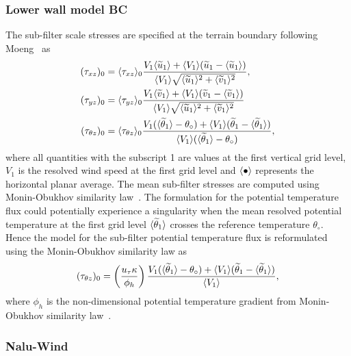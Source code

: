 \subsubsection{\label{sec:wallmodelBC}Lower wall model BC}
The sub-filter scale stresses are specified at the terrain boundary following
Moeng~\cite{Moeng1984} as
\begin{align}
 (\tau_{xz})_0 &= \langle \tau_{xz} \rangle_0 \frac{V_1 \langle \widetilde{u}_1 \rangle + \langle V_1 \rangle (\widetilde{u}_1 - \langle \widetilde{u}_1 \rangle ) }{ \langle V_1 \rangle \sqrt{\langle \widetilde{u}_1 \rangle^2 + \langle \widetilde{v}_1 \rangle^2 } } , \\
 (\tau_{yz})_0 &= \langle \tau_{yz} \rangle_0 \frac{V_1 \langle \widetilde{v}_1 \rangle + \langle V_1 \rangle (\widetilde{v}_1 - \langle \widetilde{v}_1 \rangle ) }{ \langle V_1 \rangle \sqrt{\langle \widetilde{u}_1 \rangle^2 + \langle \widetilde{v}_1 \rangle^2 } } \\
  (\tau_{\theta z})_0 &= \langle \tau_{\theta z} \rangle_0 \frac{V_1 ( \langle \widetilde{\theta}_1 \rangle - \theta_{\circ} ) + \langle V_1 \rangle (\widetilde{\theta}_1 - \langle \widetilde{\theta}_1 \rangle ) }{ \langle V_1 \rangle ( \langle \widetilde{\theta}_1 \rangle - \theta_{\circ} ) },
\end{align}
where all quantities with the subscript 1 are values at the first vertical grid
level, $V_1$ is the resolved wind speed at the first grid level and
$\langle \bullet \rangle$ represents the horizontal planar average. The mean
sub-filter stresses are computed using Monin-Obukhov similarity
law~\cite{Etling1996}. The formulation for the potential temperature flux could
potentially experience a singularity when the mean resolved potential
temperature at the first grid level $\langle \widetilde{\theta}_1 \rangle$ crosses the
reference temperature $\theta_{\circ}$. Hence the model for the sub-filter
potential temperature flux is reformulated using the Monin-Obukhov similarity
law as
\begin{equation}
(\tau_{\theta z})_0 = \left ( \frac{u_{\tau} \kappa}{ \phi_h} \right ) \frac{V_1 ( \langle \widetilde{\theta}_1 \rangle - \theta_{\circ} ) + \langle V_1 \rangle (\widetilde{\theta}_1 - \langle \widetilde{\theta}_1 \rangle ) }{ \langle V_1 \rangle },
\end{equation}
where $\phi_h$ is the non-dimensional potential temperature gradient from
Monin-Obukhov similarity law~\cite{Etling1996}.


\subsubsection{Nalu-Wind}

